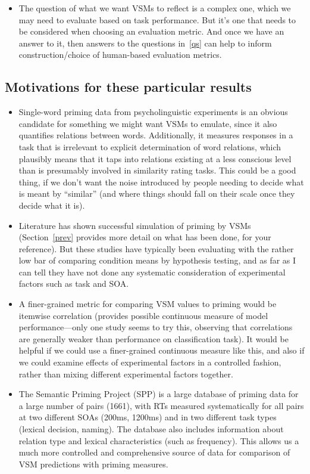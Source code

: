 \documentclass{article}
\begin{document}
\begin{itemize}
\item The question of what we want VSMs to reflect is a complex one, which we may need to evaluate based on task performance. But it's one that needs to be considered when choosing an evaluation metric. And once we have an answer to it, then answers to the questions in~\ref{qs} can help to inform construction/choice of human-based evaluation metrics. 
\end{itemize}

\subsection{Motivations for these particular results}
\begin{itemize}
\item Single-word priming data from psycholinguistic experiments is an obvious candidate for something we might want VSMs to emulate, since it also quantifies relations between words. Additionally, it measures responses in a task that is irrelevant to explicit determination of word relations, which plausibly means that it taps into relations existing at a less conscious level than is presumably involved in similarity rating tasks. This could be a good thing, if we don't want the noise introduced by people needing to decide what is meant by ``similar'' (and where things should fall on their scale once they decide what it is). 

\item Literature has shown successful simulation of priming by VSMs (Section~\ref{prev} provides more detail on what has been done, for your reference). But these studies have typically been evaluating with the rather low bar of comparing condition means by hypothesis testing, and as far as I can tell they have not done any systematic consideration of experimental factors such as task and SOA. 

\item A finer-grained metric for comparing VSM values to priming would be itemwise correlation (provides possible continuous measure of model performance---only one study seems to try this, observing that correlations are generally weaker than performance on classification task). It would be helpful if we could use a finer-grained continuous measure like this, and also if we could examine effects of experimental factors in a controlled fashion, rather than mixing different experimental factors together.

\item The Semantic Priming Project (SPP) is a large database of priming data for a large number of pairs (1661), with RTs measured systematically for all pairs at two different SOAs (200ms, 1200ms) and in two different task types (lexical decision, naming). The database also includes information about relation type and lexical characteristics (such as frequency). This allows us a much more controlled and comprehensive source of data for comparison of VSM predictions with priming measures.  


\end{itemize}
\end{document}
